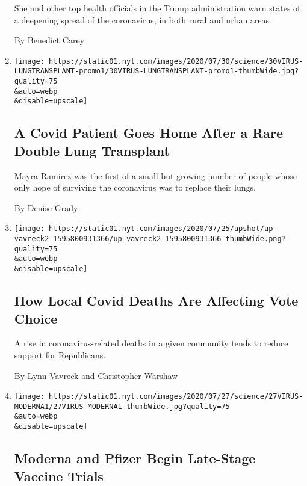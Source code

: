 \begin{enumerate}
  She and other top health officials in the Trump administration warn
  states of a deepening spread of the coronavirus, in both rural and
  urban areas.

  By Benedict Carey
\item
  \href{/2020/07/30/health/Covid-lung-transplant.html}{}

  \texttt{[image: https://static01.nyt.com/images/2020/07/30/science/30VIRUS-LUNGTRANSPLANT-promo1/30VIRUS-LUNGTRANSPLANT-promo1-thumbWide.jpg?quality=75\\\&auto=webp\\\&disable=upscale]}

  \hypertarget{a-covid-patient-goes-home-after-a-rare-double-lung-transplant}{%
  \subsection{A Covid Patient Goes Home After a Rare Double Lung
  Transplant}\label{a-covid-patient-goes-home-after-a-rare-double-lung-transplant}}

  Mayra Ramirez was the first of a small but growing number of people
  whose only hope of surviving the coronavirus was to replace their
  lungs.

  By Denise Grady
\item
  \href{/2020/07/28/upshot/polling-trump-virus-election.html}{}

  \texttt{[image: https://static01.nyt.com/images/2020/07/25/upshot/up-vavreck2-1595800931366/up-vavreck2-1595800931366-thumbWide.png?quality=75\\\&auto=webp\\\&disable=upscale]}

  \hypertarget{how-local-covid-deaths-are-affecting-vote-choice}{%
  \subsection{How Local Covid Deaths Are Affecting Vote
  Choice}\label{how-local-covid-deaths-are-affecting-vote-choice}}

  A rise in coronavirus-related deaths in a given community tends to
  reduce support for Republicans.

  By Lynn Vavreck and Christopher Warshaw
\item
  \href{/2020/07/27/health/moderna-vaccine-covid.html}{}

  \texttt{[image: https://static01.nyt.com/images/2020/07/27/science/27VIRUS-MODERNA1/27VIRUS-MODERNA1-thumbWide.jpg?quality=75\\\&auto=webp\\\&disable=upscale]}

  \hypertarget{moderna-and-pfizer-begin-late-stage-vaccine-trials}{%
  \subsection{Moderna and Pfizer Begin Late-Stage Vaccine
  Trials}\label{moderna-and-pfizer-begin-late-stage-vaccine-trials}}


\end{enumerate}
